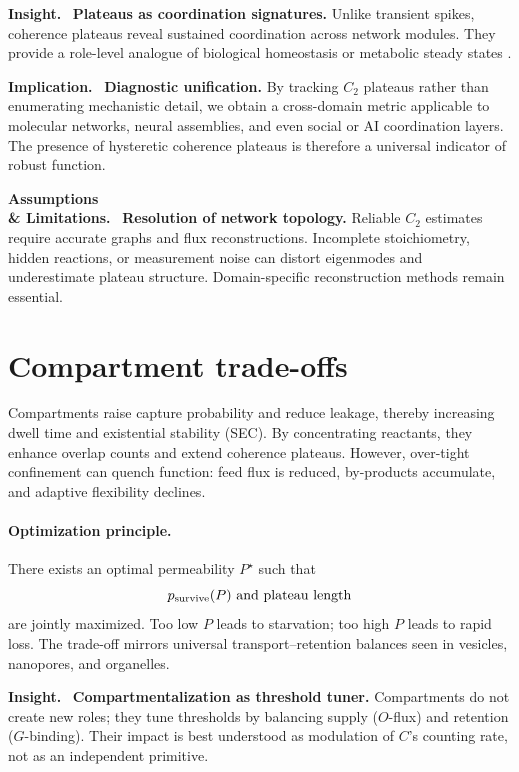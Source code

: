 \documentclass[12pt,a4paper,oneside]{scrreprt}
\newenvironment{insight}{\par\vspace{0.5em}\noindent\textbf{Insight.}\ }{\par\vspace{0.5em}}
\newenvironment{implication}{\par\vspace{0.5em}\noindent\textbf{Implication.}\ }{\par\vspace{0.5em}}
\newenvironment{limitation}{\par\vspace{0.5em}\noindent\textbf{Assumptions \\ \& Limitations.}\ }{\par\vspace{0.5em}}
\begin{document}
\begin{insight}
\textbf{Plateaus as coordination signatures.} 
Unlike transient spikes, coherence plateaus reveal 
sustained coordination across network modules. 
They provide a role-level analogue of biological 
homeostasis or metabolic steady states 
\citep{Barabasi2004NetworkBiology}. 
\end{insight}

\begin{implication}
\textbf{Diagnostic unification.} 
By tracking $C_2$ plateaus rather than enumerating 
mechanistic detail, we obtain a cross-domain metric 
applicable to molecular networks, neural assemblies, 
and even social or AI coordination layers. 
The presence of hysteretic coherence plateaus 
is therefore a universal indicator of robust function. 
\end{implication}

\begin{limitation}
\textbf{Resolution of network topology.} 
Reliable $C_2$ estimates require accurate graphs 
and flux reconstructions. 
Incomplete stoichiometry, hidden reactions, 
or measurement noise can distort eigenmodes 
and underestimate plateau structure. 
Domain-specific reconstruction methods remain essential. 
\end{limitation}

\section{Compartment trade-offs}\label{sec:compartments}

Compartments raise capture probability and reduce leakage, 
thereby increasing dwell time and existential stability (SEC). 
By concentrating reactants, they enhance overlap counts 
and extend coherence plateaus. 
However, over-tight confinement can quench function: 
feed flux is reduced, by-products accumulate, and 
adaptive flexibility declines. 

\paragraph{Optimization principle.} 
There exists an optimal permeability $P^\star$ such that 
\[
p_{\rm survive}(P)\ \text{and plateau length} 
\]
are jointly maximized. 
Too low $P$ leads to starvation; 
too high $P$ leads to rapid loss. 
The trade-off mirrors universal transport--retention balances 
seen in vesicles, nanopores, and organelles. 

\begin{insight}
\textbf{Compartmentalization as threshold tuner.} 
Compartments do not create new roles; 
they tune thresholds by balancing supply ($O$-flux) 
and retention ($G$-binding). 
Their impact is best understood as modulation of 
$C$'s counting rate, not as an independent primitive. 
\end{insight}
\end{document}
